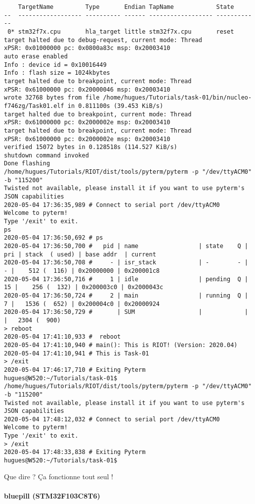 {\begin{verbatim}
    TargetName         Type       Endian TapName            State       
--  ------------------ ---------- ------ ------------------ ------------
 0* stm32f7x.cpu       hla_target little stm32f7x.cpu       reset
target halted due to debug-request, current mode: Thread 
xPSR: 0x01000000 pc: 0x0800a83c msp: 0x20003410
auto erase enabled
Info : device id = 0x10016449
Info : flash size = 1024kbytes
target halted due to breakpoint, current mode: Thread 
xPSR: 0x61000000 pc: 0x20000046 msp: 0x20003410
wrote 32768 bytes from file /home/hugues/Tutorials/task-01/bin/nucleo-f746zg/Task01.elf in 0.811100s (39.453 KiB/s)
target halted due to breakpoint, current mode: Thread 
xPSR: 0x61000000 pc: 0x2000002e msp: 0x20003410
target halted due to breakpoint, current mode: Thread 
xPSR: 0x61000000 pc: 0x2000002e msp: 0x20003410
verified 15072 bytes in 0.128518s (114.527 KiB/s)
shutdown command invoked
Done flashing
/home/hugues/Tutorials/RIOT/dist/tools/pyterm/pyterm -p "/dev/ttyACM0" -b "115200" 
Twisted not available, please install it if you want to use pyterm's JSON capabilities
2020-05-04 17:36:35,989 # Connect to serial port /dev/ttyACM0
Welcome to pyterm!
Type '/exit' to exit.
ps
2020-05-04 17:36:50,692 # ps
2020-05-04 17:36:50,700 # 	pid | name                 | state    Q | pri | stack  ( used) | base addr  | current     
2020-05-04 17:36:50,708 # 	  - | isr_stack            | -        - |   - |    512 (  116) | 0x20000000 | 0x200001c8
2020-05-04 17:36:50,716 # 	  1 | idle                 | pending  Q |  15 |    256 (  132) | 0x200003c0 | 0x2000043c 
2020-05-04 17:36:50,724 # 	  2 | main                 | running  Q |   7 |   1536 (  652) | 0x200004c0 | 0x20000924 
2020-05-04 17:36:50,729 # 	    | SUM                  |            |     |   2304 (  900)
> reboot
2020-05-04 17:41:10,933 #  reboot
2020-05-04 17:41:10,940 # main(): This is RIOT! (Version: 2020.04)
2020-05-04 17:41:10,941 # This is Task-01
> /exit
2020-05-04 17:46:17,710 # Exiting Pyterm
hugues@W520:~/Tutorials/task-01$ /home/hugues/Tutorials/RIOT/dist/tools/pyterm/pyterm -p "/dev/ttyACM0" -b "115200"
Twisted not available, please install it if you want to use pyterm's JSON capabilities
2020-05-04 17:48:12,032 # Connect to serial port /dev/ttyACM0
Welcome to pyterm!
Type '/exit' to exit.
> /exit
2020-05-04 17:48:33,838 # Exiting Pyterm
hugues@W520:~/Tutorials/task-01$
\end{verbatim}
}
Que dire ? Ça fonctionne tout seul !\\

\paragraph{bluepill (STM32F103C8T6)}~\\


